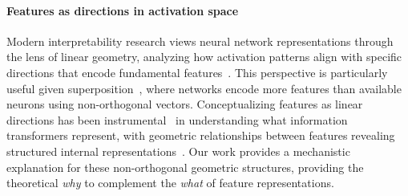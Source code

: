 \documentclass{article}
\theoremstyle{plain}
\theoremstyle{definition}
\theoremstyle{remark}
\begin{document}
\paragraph{Features as directions in activation space}



Modern interpretability research views neural network representations through the lens of linear geometry, analyzing how activation patterns align with specific directions that encode fundamental features~\cite{park2024linearrepresentationhypothesisgeometry}. This perspective is particularly useful given superposition~\cite{elhage2022superposition}, where networks encode more features than available neurons using non-orthogonal vectors. Conceptualizing features as linear directions has been instrumental~\cite{cunningham2023sae, bricken2023monosemanticity, templeton2024scaling} in understanding what information transformers represent, with geometric relationships between features revealing structured internal representations~\cite{Engels24_Not}. Our work provides a mechanistic explanation for these non-orthogonal geometric structures, providing the theoretical \textit{why} to complement the \textit{what} of feature representations.
\end{document}
